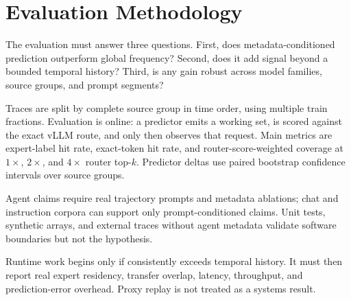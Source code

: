 \section{Evaluation Methodology}

The evaluation must answer three questions. First, does metadata-conditioned
prediction outperform global frequency? Second, does it add signal beyond a
bounded temporal history? Third, is any gain robust across model families,
source groups, and prompt segments?

Traces are split by complete source group in time order, using multiple train
fractions. Evaluation is online: a predictor emits a working set, is scored
against the exact vLLM route, and only then observes that request. Main metrics
are expert-label hit rate, exact-token hit rate, and router-score-weighted
coverage at $1\times$, $2\times$, and $4\times$ router top-$k$. Predictor
deltas use paired bootstrap confidence intervals over source groups.

Agent claims require real trajectory prompts and metadata ablations; chat and
instruction corpora can support only prompt-conditioned claims. Unit tests,
synthetic arrays, and external traces without agent metadata validate software
boundaries but not the hypothesis.

Runtime work begins only if \RouteSig consistently exceeds temporal history.
It must then report real expert residency, transfer overlap, latency, throughput,
and prediction-error overhead. Proxy replay is not treated as a systems result.
